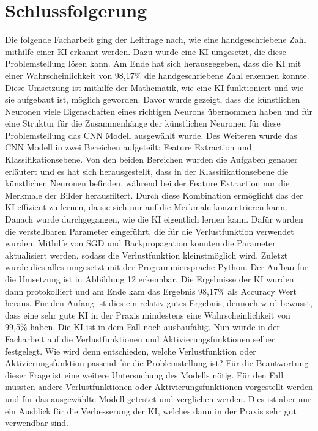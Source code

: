 \documentclass[11pt]{article}
\begin{document}
\section{Schlussfolgerung}
Die folgende Facharbeit ging der Leitfrage nach, wie eine handgeschriebene Zahl mithilfe einer KI erkannt werden. Dazu wurde eine KI umgesetzt, die diese Problemstellung lösen kann.
Am Ende hat sich herausgegeben, dass die KI mit einer Wahrscheinlichkeit von 98,17\% die handgeschriebene Zahl erkennen konnte. Diese Umsetzung ist mithilfe der Mathematik, wie
eine KI funktioniert und wie sie aufgebaut ist, möglich geworden. Davor wurde gezeigt, dass die künstlichen Neuronen viele Eigenschaften eines richtigen Neurons übernommen haben
und für eine Struktur für die Zusammenhänge der künstlichen Neuronen für diese Problemstellung das CNN Modell ausgewählt wurde. Des Weiteren wurde das CNN Modell in zwei Bereichen
aufgeteilt: Feature Extraction und Klassifikationsebene. Von den beiden Bereichen wurden die Aufgaben genauer erläutert und es hat sich herausgestellt, dass in der
Klassifikationsebene die künstlichen Neuronen befinden, während bei der Feature Extraction nur die Merkmale der Bilder herausfiltert. Durch diese Kombination ermöglicht das der KI
effizient zu lernen, da sie sich nur auf die Merkmale konzentrieren kann. Danach wurde durchgegangen, wie die KI eigentlich lernen kann. Dafür wurden die verstellbaren Parameter
eingeführt, die für die Verlustfunktion verwendet wurden. Mithilfe von SGD und Backpropagation konnten die Parameter aktualisiert werden, sodass die Verlustfunktion kleinstmöglich
wird. Zuletzt wurde dies alles umgesetzt mit der Programmiersprache Python. Der Aufbau für die Umsetzung ist in Abbildung 12 erkennbar. Die Ergebnisse der KI wurden
dann protokolliert und am Ende kam das Ergebnis 98,17\% als Accuracy Wert heraus. Für den Anfang ist dies ein relativ gutes Ergebnis,
dennoch wird bewusst, dass eine sehr gute KI in der Praxis mindestens eine Wahrscheinlichkeit von 99,5\% haben. Die KI ist in dem Fall noch ausbaufähig.
\newline
\newline
Nun wurde in der Facharbeit auf die Verlustfunktionen und Aktivierungsfunktionen selber festgelegt. Wie wird
denn entschieden, welche Verlustfunktion oder Aktivierungsfunktion passend für die Problemstellung ist?
Für die Beantwortung dieser Frage ist eine weitere Untersuchung des Modells nötig. Für den Fall müssten andere Verlustfunktionen
oder Aktivierungsfunktionen vorgestellt werden und für das ausgewählte Modell getestet und verglichen werden.
Dies ist aber nur ein Ausblick für die Verbesserung der KI, welches dann in der Praxis sehr gut verwendbar sind.
\end{document}
